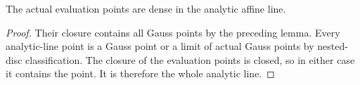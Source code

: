 \begin{theorem}\label{thm:fc-rigid-density}
\leanok
{}
The actual evaluation points are dense in the analytic affine line.
\end{theorem}

\begin{proof}
Their closure contains all Gauss points by the preceding lemma. Every
analytic-line point is a Gauss point or a limit of actual Gauss points
by nested-disc classification. The closure of the evaluation points is
closed, so in either case it contains the point. It is therefore the
whole analytic line.
\end{proof}
